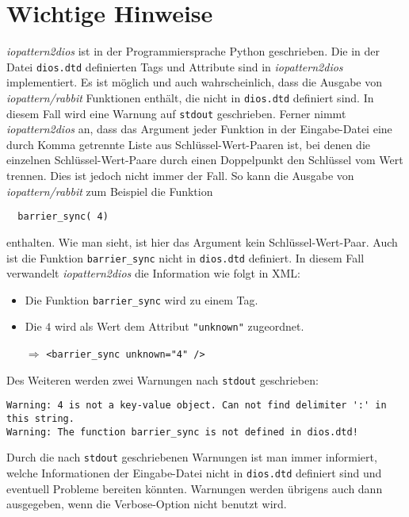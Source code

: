 \documentclass{scrartcl}
\begin{document}
\section{Wichtige Hinweise} %
\emph{iopattern2dios} ist in der Programmiersprache Python geschrieben. 
Die in der Datei \texttt{dios.dtd} definierten Tags und Attribute sind 
in \emph{iopattern2dios} implementiert. Es ist möglich und auch 
wahrscheinlich, dass die Ausgabe von \emph{iopattern/rabbit} 
Funktionen enthält, die 
nicht in \texttt{dios.dtd} definiert sind. In diesem Fall wird eine 
Warnung auf \texttt{stdout} geschrieben.
Ferner nimmt \emph{iopattern2dios} an, dass das Argument jeder Funktion in der 
Eingabe-Datei eine durch Komma getrennte Liste aus Schlüssel-Wert-Paaren ist, 
bei denen die einzelnen Schlüssel-Wert-Paare durch einen Doppelpunkt den 
Schlüssel vom Wert trennen.
Dies ist jedoch nicht immer der Fall. So kann die Ausgabe von 
\emph{iopattern/rabbit} zum Beispiel die Funktion 
\begin{verbatim}
  barrier_sync( 4)
\end{verbatim}
enthalten. Wie man sieht, ist hier das Argument kein Schlüssel-Wert-Paar.
Auch ist die Funktion \texttt{barrier\_sync} nicht in \texttt{dios.dtd}
definiert.
In diesem Fall verwandelt \emph{iopattern2dios} die Information wie folgt in
XML:
\begin{itemize}
\item Die Funktion \texttt{barrier\_sync} wird zu einem Tag. 
\item Die $4$ wird als Wert dem Attribut \verb="unknown"= zugeordnet.
\item[$\Rightarrow$] \verb+<barrier_sync unknown="4" />+
\end{itemize}
Des Weiteren werden zwei Warnungen nach \texttt{stdout} geschrieben:
\begin{verbatim}
Warning: 4 is not a key-value object. Can not find delimiter ':' in this string.
Warning: The function barrier_sync is not defined in dios.dtd!
\end{verbatim}
Durch die nach \texttt{stdout} geschriebenen Warnungen ist man immer informiert,
welche Informationen der Eingabe-Datei nicht in \texttt{dios.dtd} definiert 
sind und eventuell Probleme bereiten könnten. Warnungen werden übrigens auch
dann ausgegeben, wenn die Verbose-Option nicht benutzt wird.
\end{document}

